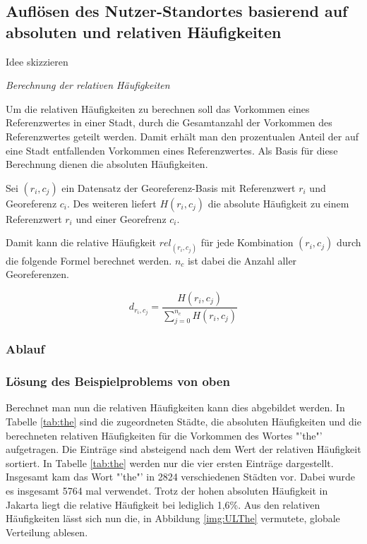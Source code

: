 		\subsection{Auflösen des Nutzer-Standortes basierend auf absoluten und relativen Häufigkeiten} 

			Idee skizzieren

			\textit{Berechnung der relativen Häufigkeiten}  

				Um die relativen Häufigkeiten zu berechnen soll das Vorkommen eines Referenzwertes in einer Stadt, durch die Gesamtanzahl der Vorkommen des Referenzwertes geteilt werden.
				Damit erhält man den prozentualen Anteil der auf eine Stadt entfallenden Vorkommen eines Referenzwertes.
				Als Basis für diese Berechnung dienen die absoluten Häufigkeiten.

				Sei $(r_i,c_j)$ ein Datensatz der Georeferenz-Basis mit Referenzwert $r_i$ und Georeferenz $c_i$.
				Des weiteren liefert $H(r_{i},c_{j})$ die absolute Häufigkeit zu einem Referenzwert $r_i$ und einer Georefrenz $c_i$. 

				Damit kann die relative Häufigkeit $rel_{(r_i,c_j)}$ für jede Kombination $(r_i,c_j)$ durch die folgende Formel berechnet werden. 
				$n_c$ ist dabei die Anzahl aller Georeferenzen.

				\begin{equation}
					d_{r_i,c_j}=\frac{H(r_i,c_j)}{\sum^{n_c}_{j=0}{H(r_i,c_j)}}
				\end{equation}	

			\subsubsection{Ablauf}

			\subsubsection{Lösung des Beispielproblems von oben}

				Berechnet man nun die relativen Häufigkeiten kann dies abgebildet werden.
				In Tabelle \ref{tab:the} sind die zugeordneten Städte, die absoluten Häufigkeiten und die berechneten relativen Häufigkeiten für die Vorkommen des Wortes "'the"' aufgetragen. 
				Die Einträge sind absteigend nach dem Wert der relativen Häufigkeit sortiert.
				In Tabelle \ref{tab:the} werden nur die vier ersten Einträge dargestellt.  
				Insgesamt kam das Wort "'the"' in 2824 verschiedenen Städten vor.
				Dabei wurde es insgesamt 5764 mal verwendet. 
				Trotz der hohen absoluten Häufigkeit in Jakarta liegt die relative Häufigkeit bei lediglich 1,6\%.
				Aus den relativen Häufigkeiten lässt sich nun die, in Abbildung \ref{img:ULThe} vermutete, globale Verteilung ablesen.


